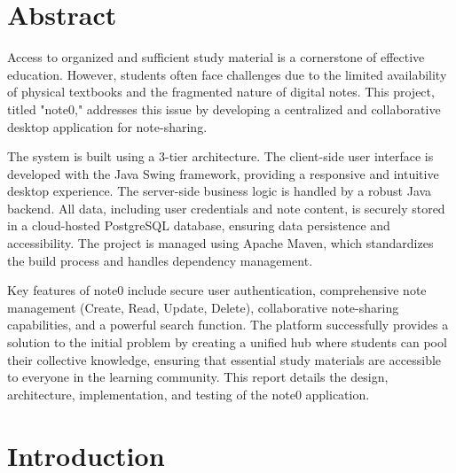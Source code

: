 \documentclass[12pt, a4paper]{report}
\begin{document}
\newpage
\chapter*{Abstract}

Access to organized and sufficient study material is a cornerstone of effective education. However, students often face challenges due to the limited availability of physical textbooks and the fragmented nature of digital notes. This project, titled "note0," addresses this issue by developing a centralized and collaborative desktop application for note-sharing.

The system is built using a 3-tier architecture. The client-side user interface is developed with the Java Swing framework, providing a responsive and intuitive desktop experience. The server-side business logic is handled by a robust Java backend. All data, including user credentials and note content, is securely stored in a cloud-hosted PostgreSQL database, ensuring data persistence and accessibility. The project is managed using Apache Maven, which standardizes the build process and handles dependency management.

Key features of note0 include secure user authentication, comprehensive note management (Create, Read, Update, Delete), collaborative note-sharing capabilities, and a powerful search function. The platform successfully provides a solution to the initial problem by creating a unified hub where students can pool their collective knowledge, ensuring that essential study materials are accessible to everyone in the learning community. This report details the design, architecture, implementation, and testing of the note0 application.

\newpage


\tableofcontents
\newpage
\listoffigures
\newpage
\listoftables
\newpage
{} %



\chapter{Introduction}
\end{document}
